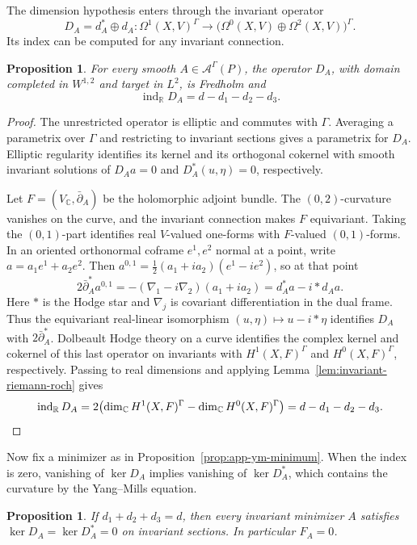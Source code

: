 \documentclass[11pt,a4paper,reqno]{amsart}
\theoremstyle{plain}
\newtheorem{proposition}[theorem]{Proposition}
\theoremstyle{definition}
\theoremstyle{remark}
\numberwithin{equation}{section}
\newcommand{\CC}{\mathbb C}
\newcommand{\RR}{\mathbb R}
\begin{document}
The dimension hypothesis enters through the invariant operator
\[
D_A=d_A^*\oplus d_A\colon\Omega^1(X,V)^\Gamma \longrightarrow \bigl(\Omega^0(X,V)\oplus\Omega^2(X,V)\bigr)^\Gamma.
\]
Its index can be computed for any invariant connection.

\begin{proposition}\label{prop:app-ym-index}
For every smooth $A\in\mathcal A^\Gamma(P)$, the operator $D_A$, with domain completed in $W^{1,2}$ and target in $L^2$, is Fredholm and
\[
\operatorname{ind}_{\RR}D_A=d-d_1-d_2-d_3.
\]
\end{proposition}

\begin{proof}
The unrestricted operator is elliptic and commutes with $\Gamma$. Averaging a parametrix over $\Gamma$ and restricting to invariant sections gives a parametrix for $D_A$. Elliptic regularity identifies its kernel and its orthogonal cokernel with smooth invariant solutions of $D_Aa=0$ and $D_A^*(u,\eta)=0$, respectively.

Let $F=(V_{\CC},\bar\partial_A)$ be the holomorphic adjoint bundle. The $(0,2)$-curvature vanishes on the curve, and the invariant connection makes $F$ equivariant. Taking the $(0,1)$-part identifies real $V$-valued one-forms with $F$-valued $(0,1)$-forms. In an oriented orthonormal coframe $e^1,e^2$ normal at a point, write $a=a_1e^1+a_2e^2$. Then $a^{0,1}=\tfrac12(a_1+i a_2)(e^1-i e^2)$, so at that point
\[
2\bar\partial_A^*a^{0,1}=-(\nabla_1-i\nabla_2)(a_1+i a_2)=d_A^*a-i* d_Aa.
\]
Here $*$ is the Hodge star and $\nabla_j$ is covariant differentiation in the dual frame. Thus the equivariant real-linear isomorphism $(u,\eta)\mapsto u-i*\eta$ identifies $D_A$ with $2\bar\partial_A^*$. Dolbeault Hodge theory on a curve identifies the complex kernel and cokernel of this last operator on invariants with $H^1(X,F)^\Gamma$ and $H^0(X,F)^\Gamma$, respectively. Passing to real dimensions and applying Lemma~\ref{lem:invariant-riemann-roch} gives
\[
\operatorname{ind}_{\RR}D_A=2\bigl(\dim_{\CC}H^1(X,F)^\Gamma-\dim_{\CC}H^0(X,F)^\Gamma\bigr)=d-d_1-d_2-d_3.\qedhere
\]
\end{proof}

Now fix a minimizer as in Proposition~\ref{prop:app-ym-minimum}. When the index is zero, vanishing of $\ker D_A$ implies vanishing of $\ker D_A^*$, which contains the curvature by the Yang--Mills equation.

\begin{proposition}\label{prop:app-ym-flat}
If $d_1+d_2+d_3=d$, then every invariant minimizer $A$ satisfies $\ker D_A=\ker D_A^*=0$ on invariant sections. In particular $F_A=0$.
\end{proposition}
\end{document}
